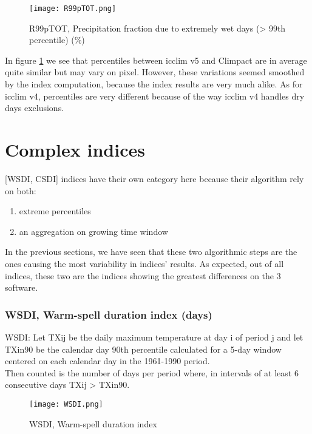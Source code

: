 \documentclass[a4paper,11pt]{article}
\begin{document}
        \begin{figure}
            \centering
            \texttt{[image: R99pTOT.png]}
            \caption{R99pTOT, Precipitation fraction due to extremely wet days (> 99th percentile) (\%)}
            \label{figure/r99ptot}
        \end{figure}

        In figure \ref{figure/r99ptot} we see that percentiles between icclim v5 and Climpact are in average quite similar but may vary on pixel.
        However, these variations seemed smoothed by the index computation, because the index results are very much alike.
        As for icclim v4, percentiles are very different because of the way icclim v4 handles dry days exclusions. 


\part{Complex indices}
\label{part/complex_indices}
    [WSDI, CSDI] indices have their own category here because their algorithm rely on both:
    \begin{enumerate}
        \item extreme percentiles
        \item an aggregation on growing time window
    \end{enumerate}
    In the previous sections, we have seen that these two algorithmic steps are the ones causing the most variability in indices' results.
    As expected, out of all indices, these two are the indices showing the greatest differences on the 3 software.

    \section{WSDI, Warm-spell duration index (days)}
        WSDI: Let TXij be the daily maximum temperature at day i of period j and let TXin90 be the calendar day 90th percentile calculated for a 5-day window centered on each calendar day in the 1961-1990 period.\\
        Then counted is the number of days per period where, in intervals of at least 6 consecutive days TXij > TXin90.

        \begin{figure}[h]
            \centering
            \texttt{[image: WSDI.png]}
            \caption{WSDI, Warm-spell duration index}
            \label{figure/wsdi}
        \end{figure}
        
\end{document}
